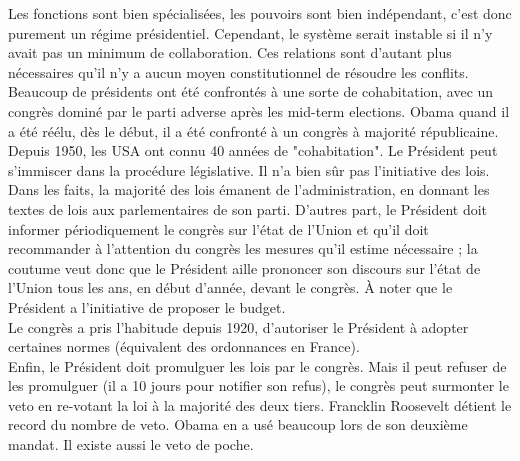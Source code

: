 \documentclass[10pt, a4paper, openany]{book}
\begin{document}
Les fonctions sont bien spécialisées, les pouvoirs sont bien indépendant, c'est donc purement un régime présidentiel. Cependant, le système serait instable si il n'y avait pas un minimum de collaboration. Ces relations sont d'autant plus nécessaires qu'il n'y a aucun moyen constitutionnel de résoudre les conflits. Beaucoup de présidents ont été confrontés à une sorte de cohabitation, avec un congrès dominé par le parti adverse après les mid-term elections. Obama quand il a été réélu, dès le début, il a été confronté à un congrès à majorité républicaine. \\
Depuis 1950, les USA ont connu 40 années de "cohabitation". Le Président peut s'immiscer dans la procédure législative. Il n'a bien sûr pas l'initiative des lois. Dans les faits, la majorité des lois émanent de l'administration, en donnant les textes de lois aux parlementaires de son parti. D'autres part, le Président doit informer périodiquement le congrès sur l'état de l'Union et qu'il doit recommander à l'attention du congrès les mesures qu'il estime nécessaire ; la coutume veut donc que le Président aille prononcer son discours sur l'état de l'Union tous les ans, en début d'année, devant le congrès. À noter que le Président a l'initiative de proposer le budget. \\
Le congrès a pris l'habitude depuis 1920, d'autoriser le Président à adopter certaines normes (équivalent des ordonnances en France). \\
Enfin, le Président doit promulguer les lois par le congrès. Mais il peut refuser de les promulguer (il a 10 jours pour notifier son refus), le congrès peut surmonter le veto en re-votant la loi à la majorité des deux tiers. Francklin Roosevelt détient le record du nombre de veto. Obama en a usé beaucoup lors de son deuxième mandat. Il existe aussi le veto de poche.
\end{document}
